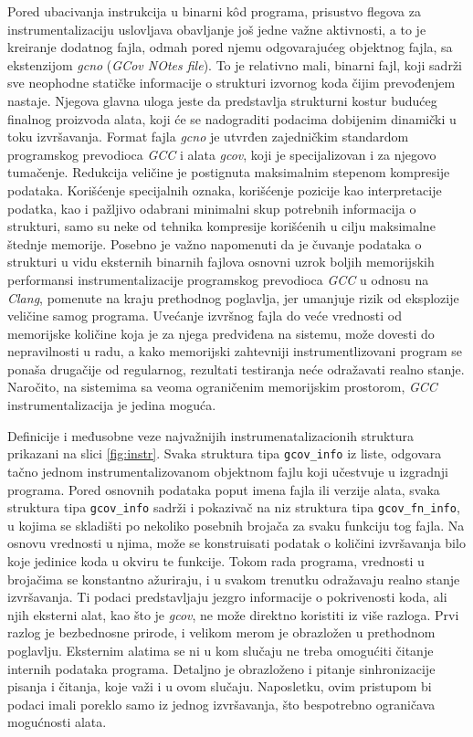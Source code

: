 \documentclass[12pt,oneside]{memoir}
\newcommand{\kod}[1]{\texttt{#1}}
\newcommand{\strano}[1]{\textit{#1}}
\begin{document}
Pored ubacivanja instrukcija u binarni k\^{o}d programa, prisustvo flegova za instrumentalizaciju uslovljava obavljanje još jedne važne aktivnosti, a to je kreiranje dodatnog fajla, odmah pored njemu odgovarajućeg objektnog fajla, sa ekstenzijom \strano{gcno} (\strano{GCov NOtes file}). To je relativno mali, binarni fajl, koji sadrži sve neophodne statičke informacije o strukturi izvornog koda čijim prevođenjem nastaje. Njegova glavna uloga jeste da predstavlja strukturni kostur budućeg finalnog proizvoda alata, koji će se nadograditi podacima dobijenim dinamički u toku izvršavanja. Format fajla \strano{gcno} je utvrđen zajedničkim standardom programskog prevodioca \strano{GCC} i alata \strano{gcov}, koji je specijalizovan i za njegovo tumačenje. Redukcija veličine je postignuta maksimalnim stepenom kompresije podataka. Korišćenje specijalnih oznaka, korišćenje pozicije kao interpretacije podatka, kao i pažljivo odabrani minimalni skup potrebnih informacija o strukturi, samo su neke od tehnika kompresije korišćenih u cilju maksimalne štednje memorije. Posebno je važno napomenuti da je čuvanje podataka o strukturi u vidu eksternih binarnih fajlova osnovni uzrok boljih memorijskih performansi instrumentalizacije programskog prevodioca \strano{GCC} u odnosu na \strano{Clang}, pomenute na kraju prethodnog poglavlja, jer umanjuje rizik od eksplozije veličine samog programa.
Uvećanje izvršnog fajla do veće vrednosti od memorijske količine koja je za njega predviđena na sistemu, može dovesti do nepravilnosti u radu, a kako memorijski zahtevniji instrumentlizovani program se ponaša drugačije od regularnog, rezultati testiranja neće odražavati realno stanje. Naročito, na sistemima sa veoma ograničenim memorijskim prostorom, \strano{GCC} instrumentalizacija je jedina moguća.

Definicije i međusobne veze najvažnijih instrumenatalizacionih struktura prikazani na slici \ref{fig:instr}. 
Svaka struktura tipa \kod{gcov\_info} iz liste, odgovara tačno jednom instrumentalizovanom objektnom fajlu koji učestvuje u izgradnji programa. Pored osnovnih podataka poput imena fajla ili verzije alata, svaka struktura tipa \kod{gcov\_info} sadrži i pokazivač na niz struktura tipa \kod{gcov\_fn\_info}, u kojima se skladišti po nekoliko posebnih brojača za svaku funkciju tog fajla. Na osnovu vrednosti u njima, može se konstruisati podatak o količini izvršavanja bilo koje jedinice koda u okviru te funkcije. Tokom rada programa, vrednosti u brojačima se konstantno ažuriraju, i u svakom trenutku odražavaju realno stanje izvršavanja. Ti podaci predstavljaju jezgro informacije o pokrivenosti koda, ali njih eksterni alat, kao što je \strano{gcov}, ne može direktno koristiti iz više razloga. Prvi razlog je bezbednosne prirode, i velikom merom je obrazložen u prethodnom poglavlju. Eksternim alatima se ni u kom slučaju ne treba omogućiti čitanje internih podataka programa. Detaljno je obrazloženo i pitanje sinhronizacije pisanja i čitanja, koje važi i u ovom slučaju. Naposletku, ovim pristupom bi podaci imali poreklo samo iz jednog izvršavanja, što bespotrebno ograničava mogućnosti alata. 
\\
\end{document}

